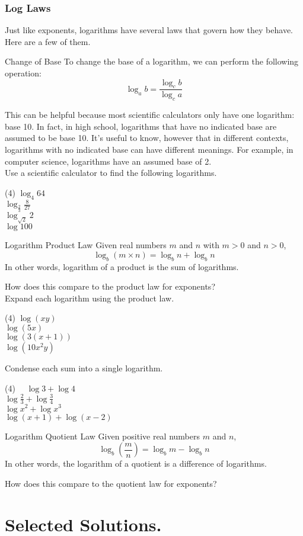 \documentclass[12pt,fleqn]{book}
\begin{document}
\subsection*{Log Laws}
Just like exponents, logarithms have several laws that govern how they behave.  Here are a few of them.
\begin{thm}{Change of Base}{}
To change the base of a logarithm, we can perform the following operation:
\[
    \log_a b = \frac{\log_c b}{\log_c a}
\]
\end{thm}
This can be helpful because most scientific calculators only have one logarithm: base 10.  In fact, in high school, logarithms that have no indicated base are assumed to be base 10.  It's useful to know, however that in different contexts, logarithms with no indicated base can have different meanings.  For example, in computer science, logarithms have an assumed base of 2. 
\\[1em]
Use a scientific calculator to find the following logarithms.
\begin{tasks}(4)  
 \task $\log _4 64$  
 \\[1in]
 \task $\log _{\frac{2}{3}} \frac{8}{27}$  
 \\[1in]
 \task $\log _{\sqrt{2}} 2$  
 \\[1in]
 \task $\log 100$
 \\[1in]
\end{tasks}
\begin{thm}{Logarithm Product Law}{}
    Given real numbers $m$ and $n$ with $m>0$ and $n>0$,
\[
\log _b(m \times n)=\log _b n+\log _b n
\]
In other words, logarithm of a product is the sum of logarithms.
\end{thm}
How does this compare to the product law for exponents?
\\[1in]
Expand each logarithm using the product law.
\begin{tasks}(4)
\task $\log (x y)$
\\[1in]
\task $\log (5x)$
\\[1in]
\task $\log (3(x+1))$
\\[1in]
\task $\log (10x^2y)$
\\[1in]
\end{tasks}
Condense each sum into a single logarithm.
\begin{tasks}(4)
\task $\quad \log 3+\log 4$
\\[1in]
\task $\log \frac{2}{3}+\log \frac{3}{4}$
\\[1in]
\task $\log x^2+\log x^3$
\\[1in]
\task $\log (x+1)+\log (x-2)$
\\[1in]
\end{tasks}
\begin{thm}{Logarithm Quotient Law}{}
    Given positive real numbers $m$ and $n$,
    \[
\log _b\left(\frac{m}{n}\right)=\log _b m-\log _b n
\]
In other words, the logarithm of a quotient is a difference of logarithms.
\end{thm}
How does this compare to the quotient law for exponents?

\chapter{Selected Solutions.}
\shipoutAnswer
\end{document}
